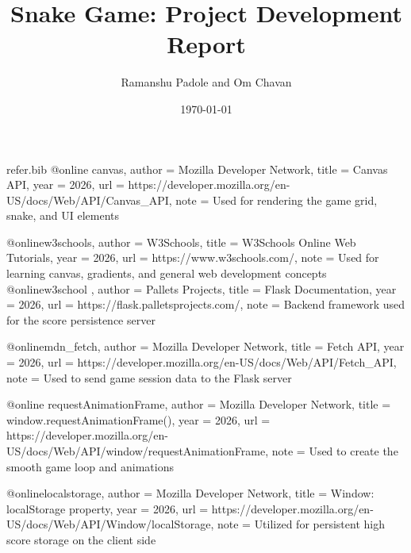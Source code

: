 \begin{filecontents}{refer.bib}
@online{ canvas,
    author = {{Mozilla Developer Network}},
    title = {Canvas API},
    year = {2026},
    url = {https://developer.mozilla.org/en-US/docs/Web/API/Canvas_API},
    note = {Used for rendering the game grid, snake, and UI elements}
}

@online{w3schools,
    author = {{W3Schools}},
    title = {W3Schools Online Web Tutorials},
    year = {2026},
    url = {https://www.w3schools.com/},
    note = {Used for learning canvas, gradients, and general web development concepts}
}
@online{w3school ,
    author = {Pallets Projects},
    title = {Flask Documentation},
    year = {2026},
    url = {https://flask.palletsprojects.com/},
    note = {Backend framework used for the score persistence server}
}


@online{mdn_fetch,
    author = {{Mozilla Developer Network}},
    title = {Fetch API},
    year = {2026},
    url = {https://developer.mozilla.org/en-US/docs/Web/API/Fetch_API},
    note = {Used to send game session data to the Flask server}
}

@online{ requestAnimationFrame,
    author = {{Mozilla Developer Network}},
    title = {window.requestAnimationFrame()},
    year = {2026},
    url = {https://developer.mozilla.org/en-US/docs/Web/API/window/requestAnimationFrame},
    note = {Used to create the smooth game loop and animations}
}

@online{localstorage,
    author = {{Mozilla Developer Network}},
    title = {Window: localStorage property},
    year = {2026},
    url = {https://developer.mozilla.org/en-US/docs/Web/API/Window/localStorage},
    note = {Utilized for persistent high score storage on the client side}
}
\end{filecontents}

\documentclass[11pt]{article}
\usepackage[utf8]{inputenc}
\usepackage[margin=1in]{geometry}
\usepackage{hyperref}
\usepackage{enumitem}
\usepackage{listings}
\usepackage{xcolor}
\usepackage{graphicx}
\usepackage{mdframed}
\usepackage[backend=bibtex]{biblatex}

 
\hypersetup{
    colorlinks=true,
    linkcolor=blue,
    filecolor=magenta,      
    urlcolor=cyan,
}


\title{\textbf{Snake Game: Project Development Report}}
\author{Ramanshu Padole and Om Chavan}
\date{\today}



